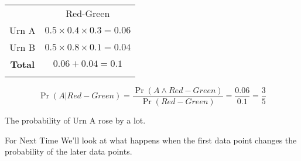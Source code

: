 \documentclass[
  ignorenonframetext,
]{beamer}
\renewcommand{\,}{\text{, }}
\begin{document}
\begin{frame}
\begin{longtable}[]{@{}cc@{}}
\toprule
& Red-Green \\ \addlinespace
\midrule
\endhead
Urn A & \(0.5 \times 0.4 \times 0.3 = 0.06\) \\ \addlinespace
Urn B & \(0.5 \times 0.8 \times 0.1 = 0.04\) \\ \addlinespace
\textbf{Total} & \(0.06 + 0.04 = 0.1\) \\ \addlinespace
\bottomrule
\end{longtable}

\[
\Pr(A | Red-Green) = \frac{\Pr(A \wedge Red-Green)}{\Pr(Red-Green)} = \frac{0.06}{0.1} = \frac{3}{5}
\]

\bigskip

The probability of Urn A rose by a lot.
\end{frame}

\begin{frame}{For Next Time}
\protect\hypertarget{for-next-time}{}
We'll look at what happens when the first data point changes the
probability of the later data points.
\end{frame}
\end{document}
